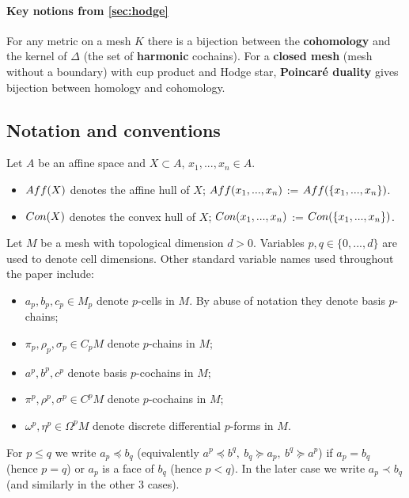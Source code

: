 \documentclass{elsarticle}
\theoremstyle{definition}
\newcommand{\Aff}{\mathop{\rm Aff}\nolimits} %
\newcommand{\Con}{\mathop{\rm Con}\nolimits} %
\begin{document}
\paragraph{Key notions from \ref{sec:hodge}}
For any metric on a mesh $K$ there is a bijection between the \textbf{cohomology} and the kernel of $\Delta$ (the set of \textbf{harmonic} cochains). For a \textbf{closed mesh} (mesh without a boundary) with cup product and Hodge star, \textbf{Poincar\'e duality} gives bijection between homology and cohomology.

\subsection{Notation and conventions}
\label{sec:notation}
Let $A$ be an affine space and $X \subset A$, $x_1, ..., x_n \in A$.
\begin{itemize}
  \item
    $\Aff(X)$ denotes the affine hull of $X$; $\Aff(x_1, ..., x_n)$ := $\Aff(\{x_1, ..., x_n\})$.
  \item
    $\Con(X)$ denotes the convex hull of $X$; $\Con(x_1, ..., x_n)$ := $\Con(\{x_1, ..., x_n\})$.
\end{itemize}
Let $M$ be a mesh with topological dimension $d > 0$. Variables $p, q \in \{0,...,d\}$ are used to denote cell dimensions. Other standard variable names used throughout the paper include:
\begin{itemize}
  \item
    $a_p, b_p, c_p \in M_p$ denote $p$-cells in $M$. By abuse of notation they denote basis $p$-chains;
  \item
    $\pi_p, \rho_p, \sigma_p \in C_p M$ denote $p$-chains in $M$;
  \item
    $a^p, b^p, c^p$ denote basis $p$-cochains in $M$;
  \item
    $\pi^p, \rho^p, \sigma^p \in C^p M$ denote $p$-cochains in $M$;
  \item
    $\omega^p, \eta^p \in \Omega^p M$ denote discrete differential $p$-forms in $M$.
\end{itemize}
For $p \leq q$ we write $a_p \preceq b_q$ (equivalently $a^p \preceq b^q,\ b_q \succeq a_p,\ b^q \succeq a^p$) if $a_p = b_q$ (hence $p = q$) or $a_p$ is a face of $b_q$ (hence $p < q$). In the later case we write $a_p \prec b_q$ (and similarly in the other $3$ cases).
\end{document}
